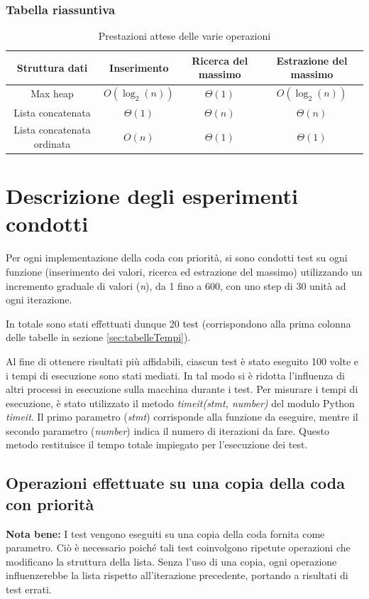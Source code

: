 \documentclass{article}
\begin{document}
\subsubsection{Tabella riassuntiva}

\begin{table}[ht]
  \centering
  \begin{tabular}{cccc}
    \toprule
    Struttura dati & Inserimento & Ricerca del massimo & Estrazione del massimo \\
    \midrule
    Max heap & $O(\log_2(n))$ & $\Theta(1)$ & $O(\log_2(n))$   \\
    \hdashline
    Lista concatenata & $\Theta(1)$ & $\Theta(n)$ & $\Theta(n)$   \\
    \hdashline
    Lista concatenata ordinata & $O(n)$ & $\Theta(1)$ & $\Theta(1)$  \\
    \bottomrule
  \end{tabular}
    \caption{Prestazioni attese delle varie operazioni}
    \label{tab:Prestazioni}
\end{table}

\clearpage

\section{Descrizione degli esperimenti condotti}
Per ogni implementazione della coda con priorità, si sono condotti test su ogni funzione (inserimento dei valori, ricerca ed estrazione del massimo) utilizzando un incremento graduale di valori (\textit{n}), da 1 fino a 600, con uno step di 30 unità ad ogni iterazione. 

In totale sono stati effettuati dunque 20 test (corrispondono alla prima colonna delle tabelle in sezione \ref{sec:tabelleTempi}).

Al fine di ottenere risultati più affidabili, ciascun test è stato eseguito 100 volte e i tempi di esecuzione sono stati mediati. In tal modo si è ridotta l'influenza di altri processi in esecuzione sulla macchina durante i test. Per misurare i tempi di esecuzione, è stato utilizzato il metodo \textit{timeit(stmt, number)} del modulo Python \textit{timeit}. Il primo parametro (\emph{stmt}) corrisponde alla funzione da eseguire, mentre il secondo parametro (\emph{number}) indica il numero di iterazioni da fare. Questo metodo restituisce il tempo totale impiegato per l'esecuzione dei test.

\subsection{Operazioni effettuate su una copia della coda con priorità}
\textbf{Nota bene:}  I test vengono eseguiti su una copia della coda fornita come parametro. Ciò è necessario poiché tali test coinvolgono ripetute operazioni che modificano la struttura della lista. Senza l'uso di una copia, ogni operazione influenzerebbe la lista rispetto all'iterazione precedente, portando a risultati di test errati.
\end{document}
